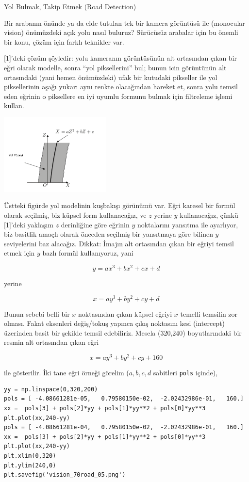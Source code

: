 \documentclass[12pt,fleqn]{article}\usepackage{../../common}
\begin{document}
Yol Bulmak, Takip Etmek (Road Detection)

Bir arabanın önünde ya da elde tutulan tek bir kamera görüntüsü ile
(monocular vision) önümüzdeki açık yolu nasıl buluruz? Sürücüsüz arabalar
için bu önemli bir konu, çözüm için farklı teknikler var. 

[1]'deki çözüm şöyledir: yolu kameranın görüntüsünün alt ortasından çıkan
bir eğri olarak modelle, sonra ``yol piksellerini'' bul; bunun icin
görüntünün alt ortasındaki (yani hemen önümüzdeki) ufak bir kutudaki
pikseller ile yol piksellerinin aşağı yukarı aynı renkte olacağından
hareket et, sonra yolu temsil eden eğrinin o piksellere en iyi uyumlu
formunu bulmak için filtreleme işlemi kullan.

\includegraphics[width=15em]{vision_70road_03.png}

Üstteki figürde yol modelinin kuşbakışı görünümü var. Eğri karesel bir
formül olarak seçilmiş, biz küpsel form kullanacağız, ve $z$ yerine $y$
kullanacağız, çünkü [1]'deki yaklaşım $z$ derinliğine göre eğrinin $y$
noktalarını yansıtma ile ayarlıyor, biz basitlik amaçlı olarak önceden
seçilmiş bir yansıtmaya göre bilinen $y$ seviyelerini baz alacağız. Dikkat:
İmajın alt ortasından çıkan bir eğriyi temsil etmek için $y$ bazlı formül
kullanıyoruz, yani

$$ y = ax^3 + bx^2 + cx + d$$

yerine 

$$ x = ay^3 + by^2 + cy + d$$

Bunun sebebi belli bir $x$ noktasından çıkan küpsel eğriyi $x$ temelli
temsilin zor olması. Fakat eksenleri değiş/tokuş yapınca çıkış noktasını kesi
(intercept) üzerinden basit bir şekilde temsil edebiliriz. Mesela (320,240)
boyutlarındaki bir resmin alt ortasından çıkan eğri

$$ x = ay^3 + by^2 + cy + 160 $$

ile gösterilir. İki tane eğri örneği görelim ($a,b,c,d$ sabitleri
\verb!pols! içinde),

\begin{verbatim}
yy = np.linspace(0,320,200)
pols = [ -4.08661281e-05,   0.79580150e-02,  -2.02432986e-01,   160.]
xx =  pols[3] + pols[2]*yy + pols[1]*yy**2 + pols[0]*yy**3
plt.plot(xx,240-yy)
pols = [ -4.08661281e-04,   0.79580150e-02,  -2.02432986e-01,   160.]
xx =  pols[3] + pols[2]*yy + pols[1]*yy**2 + pols[0]*yy**3
plt.plot(xx,240-yy)
plt.xlim(0,320)
plt.ylim(240,0)
plt.savefig('vision_70road_05.png')
\end{verbatim}
\end{document}
